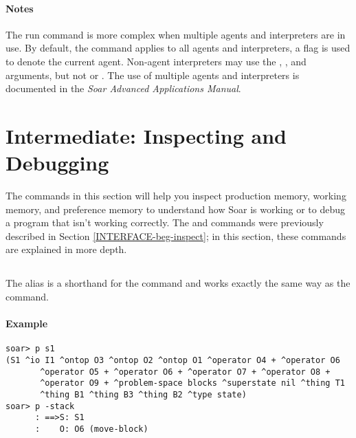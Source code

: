 {\paragraph{Notes}

The run command is more complex when multiple agents and interpreters are in
use. By default, the command applies to all agents and interpreters, a
 flag is used to denote the current agent. Non-agent interpreters
may use the , , and  arguments, but not  or
. The use of multiple agents and interpreters is documented in the
\textit{Soar Advanced Applications Manual}.



\section{Intermediate: Inspecting and Debugging}

The commands in this section will help you inspect production memory, working
memory, and preference memory to understand how Soar is working or to debug a
program that isn't working correctly. The  and 
commands were previously described in Section \ref{INTERFACE-beg-inspect}; in
this section, these commands are explained in more depth.

\subsection{}
\label{p}

The  alias is a shorthand for the  command and works
exactly the same way as the  command.

\paragraph{Example}
\begin{verbatim}
soar> p s1
(S1 ^io I1 ^ontop O3 ^ontop O2 ^ontop O1 ^operator O4 + ^operator O6
       ^operator O5 + ^operator O6 + ^operator O7 + ^operator O8 +
       ^operator O9 + ^problem-space blocks ^superstate nil ^thing T1
       ^thing B1 ^thing B3 ^thing B2 ^type state)
soar> p -stack
      : ==>S: S1 
      :    O: O6 (move-block)
\end{verbatim}

}
